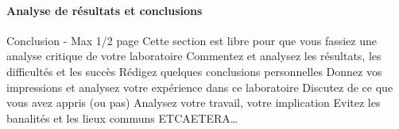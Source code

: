 \documentclass[a4paper]{article}
\begin{document}
\paragraph{Analyse de résultats et conclusions}
\begin{tcolorbox}[colframe=Monokaimagenta,colback=white]
Conclusion - Max 1/2 page 
Cette section est libre pour que vous fassiez une analyse critique de votre laboratoire
Commentez et analysez 
les résultats, 
les difficultés et les succès
Rédigez quelques conclusions personnelles
Donnez vos impressions et analysez votre expérience dans ce laboratoire
Discutez de ce que vous avez appris (ou pas)
Analysez votre travail, votre implication
Evitez les banalités et les lieux communs
ETCAETERA…
\end{tcolorbox}
\end{document}
